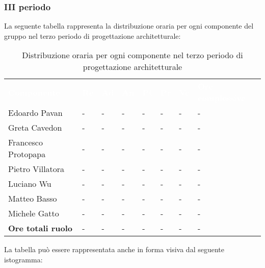 \subsubsection{III periodo}
La seguente tabella rappresenta la distribuzione oraria per ogni componente del gruppo nel terzo periodo di progettazione architetturale:
\begin{table}[!htbp]
\begin{center}
\renewcommand{\arraystretch}{1.25}
\begin{tabular}{ m{}<{\centering}  m{}<{\centering} m{}<{\centering} m{}<{\centering}  m{}<{\centering}  m{}<{\centering}  m{}<{\centering}  m{}<{\centering}   }
	\rowcolor{darkblue}
	\textcolor{white}{\textbf{Componente}} &\textcolor{white}{\textbf{Re}}&\textcolor{white}{\textbf{Ad}}&\textcolor{white}{\textbf{An}}&\textcolor{white}{\textbf{Pt}}&\textcolor{white}{\textbf{Pr}}&\textcolor{white}{\textbf{Ve}}&\textcolor{white}{\textbf{Ore complessive}}\\ 

	Edoardo Pavan & - & - & - & - & - & - & -\\	

	Greta Cavedon & - & - & - & - & - & - & -\\
	
	Francesco Protopapa & - & - & - & - & - & - & -\\
	
	Pietro Villatora & - & - & - & - & - & - & -\\
	
	Luciano Wu & - & - & - & - & - & - & -\\
	
	Matteo Basso & - & - & - & - & - & - & -\\
	
	Michele Gatto & - & - & - & - & - & - & -\\
	
	\textbf{Ore totali ruolo} & - & - & - & - & - & - & -\\

\end{tabular}
\caption{Distribuzione oraria per ogni componente nel terzo periodo di progettazione architetturale}
\end{center}
\end{table}

La tabella può essere rappresentata anche in forma visiva dal seguente istogramma:

